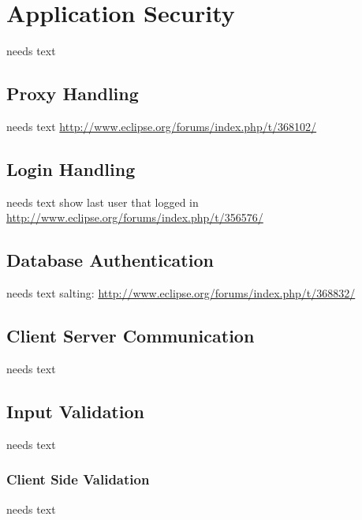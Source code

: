 \documentclass[a4paper,10pt,twoside]{book}
\begin{document}
  \sloppy
\fi


\chapter{Application Security}
needs text

\section{Proxy Handling}
needs text
\url{http://www.eclipse.org/forums/index.php/t/368102/}

\section{Login Handling}
needs text
show last user that logged in \url{http://www.eclipse.org/forums/index.php/t/356576/}

\section{Database Authentication}
needs text
salting: \url{http://www.eclipse.org/forums/index.php/t/368832/}

\section{Client Server Communication}
needs text

\section{Input Validation}
needs text

\subsection{Client Side Validation}
needs text

\end{document}
